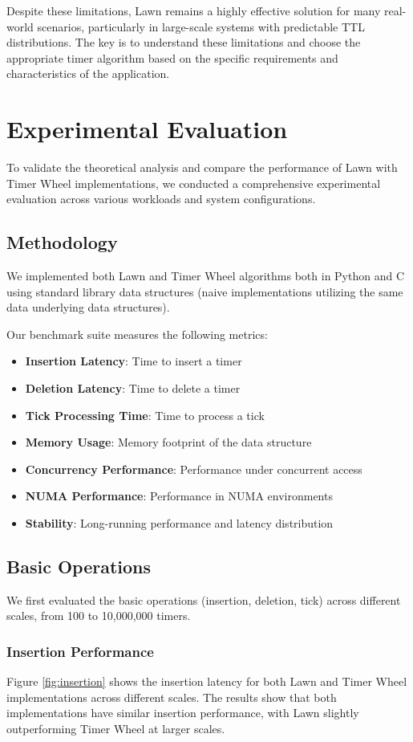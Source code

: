 \documentclass[conference]{IEEEtran}
\begin{document}
Despite these limitations, Lawn remains a highly effective solution for many real-world scenarios, particularly in large-scale systems with predictable TTL distributions. The key is to understand these limitations and choose the appropriate timer algorithm based on the specific requirements and characteristics of the application.

\section{Experimental Evaluation}
To validate the theoretical analysis and compare the performance of Lawn with Timer Wheel implementations, we conducted a comprehensive experimental evaluation across various workloads and system configurations.

\subsection{Methodology}
We implemented both Lawn and Timer Wheel algorithms both in Python and C using standard library data structures (naive implementations utilizing the same data underlying data structures).

Our benchmark suite measures the following metrics:
\begin{itemize}
    \item \textbf{Insertion Latency}: Time to insert a timer
    \item \textbf{Deletion Latency}: Time to delete a timer
    \item \textbf{Tick Processing Time}: Time to process a tick
    \item \textbf{Memory Usage}: Memory footprint of the data structure
    \item \textbf{Concurrency Performance}: Performance under concurrent access
    \item \textbf{NUMA Performance}: Performance in NUMA environments
    \item \textbf{Stability}: Long-running performance and latency distribution
\end{itemize}

\subsection{Basic Operations}
We first evaluated the basic operations (insertion, deletion, tick) across different scales, from 100 to 10,000,000 timers.

\subsubsection{Insertion Performance}
Figure \ref{fig:insertion} shows the insertion latency for both Lawn and Timer Wheel implementations across different scales. The results show that both implementations have similar insertion performance, with Lawn slightly outperforming Timer Wheel at larger scales.
\end{document}
